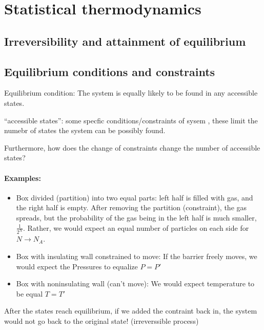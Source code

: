 \documentclass[../main.tex]{subfiles}
\begin{document}
\pagestyle{fancy}

\section{Statistical thermodynamics}
\barh \vspace*{1em}

\subsection*{Irreversibility and attainment of equilibrium}

\subsection{Equilibrium conditions and constraints}

Equilibrium condition: The system is equally likely to be found in any accessible states.

``accessible states'': some specfic conditions/constraints of sysem , these limit the numebr of states the system can be possibly found.

Furthermore, how does the change of constraints change the number of accessible states?

\paragraph*{Examples:}

\begin{itemize}
    \item Box divided (partition) into two equal parts: left half is filled with gas, and the right half is empty. 
    After removing the partition (constraint), the gas spreads, but the probability of the gas being in the left half is much smaller, $\frac{1}{2^N}$. 
    Rather, we would expect an equal number of particles on each side for $N \to N_A$.
    \item Box with insulating wall constrained to move:
    If the barrier freely moves, we would expect the Pressures to equalize $P = P'$
    \item Box with noninsulating wall (can't move): We would expect temperature to be equal $T = T'$
\end{itemize}

After the states reach equilibrium, if we added the contraint back in, the system would not go back to the original state! (irreverssible process)
\end{document}

